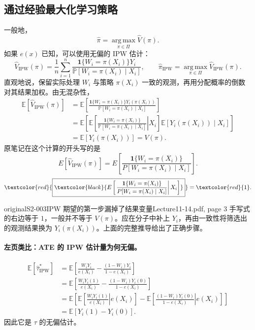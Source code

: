\subsection{通过经验最大化学习策略}
一般地，
\[
 \widehat\pi=\operatorname*{arg\,max}_{\pi\in\Pi}\widehat V(\pi).
\]
如果 $e(x)$ 已知，可以使用无偏的 IPW 估计：
\[
 \widehat V_{\mathrm{IPW}}(\pi)
 =\frac1n\sum_{i=1}^n
 \frac{\mathbf1\{W_i=\pi(X_i)\}Y_i}
 {\mathbb P[W_i=\pi(X_i)\mid X_i]},
 \qquad
 \widehat\pi_{\mathrm{IPW}}
 =\operatorname*{arg\,max}_{\pi\in\Pi}\widehat V_{\mathrm{IPW}}(\pi).
\]
直观地说，保留实际处理 $W_i$ 与策略 $\pi(X_i)$ 一致的观测，再用分配概率的倒数对其结果加权。由无混杂性，
\begin{align*}
 \mathbb E[\widehat V_{\mathrm{IPW}}(\pi)]
 &=\mathbb E\left[
 \frac{\mathbf1\{W_i=\pi(X_i)\}Y_i(\pi(X_i))}
 {\mathbb P[W_i=\pi(X_i)\mid X_i]}\right]\\
 &=\mathbb E\left[
 \mathbb E\left[\left.
 \frac{\mathbf1\{W_i=\pi(X_i)\}}
 {\mathbb P[W_i=\pi(X_i)\mid X_i]}\right|X_i\right]
 \mathbb E[Y_i(\pi(X_i))\mid X_i]\right]\\
 &=\mathbb E[Y_i(\pi(X_i))]=V(\pi).
\end{align*}
原笔记在这个计算的开头写的是
\[
 E[\widehat V_{\mathrm{IPW}}(\pi)]
 =E\left[\frac{\mathbf1\{W_i=\pi(X_i)\}}{P[W_i=\pi(X_i)\mid X_i]}\right].
\]
\[
 \textcolor{red}{\boxed{\textcolor{black}{E\left[\left.
 \frac{\mathbf1\{W_i=\pi(X_i)\}}{P[W_i=\pi(X_i)\mid X_i]}
 \right|X_i\right]}}}=\textcolor{red}{1}.
\]


\begin{reviewnote}{original}{S2-003}{IPW 期望的第一步漏掉了结果变量}{Lecture11-14.pdf, page 3}
手写式的右边等于 $1$，一般并不等于 $V(\pi)$。应在分子中补上 $Y_i$，再由一致性将筛选出的观测结果换为 $Y_i(\pi(X_i))$。上面的完整推导给出了正确步骤。
\end{reviewnote}


\paragraph{左页类比：ATE 的 IPW 估计量为何无偏。}
\begin{align*}
 \mathbb E[\widehat\tau^*_{\mathrm{IPW}}]
 &=\mathbb E\left[\frac{W_iY_i}{e(X_i)}-
 \frac{(1-W_i)Y_i}{1-e(X_i)}\right]\\
 &=\mathbb E\left[\frac{W_iY_i(1)}{e(X_i)}-
 \frac{(1-W_i)Y_i(0)}{1-e(X_i)}\right]\\
 &=\mathbb E\left[
 \mathbb E\left[\left.\frac{W_iY_i(1)}{e(X_i)}\right|e(X_i)\right]
 -\mathbb E\left[\left.\frac{(1-W_i)Y_i(0)}{1-e(X_i)}\right|e(X_i)\right]
 \right]\\
 &=\mathbb E[Y_i(1)-Y_i(0)].
\end{align*}
因此它是 $\tau$ 的无偏估计。

